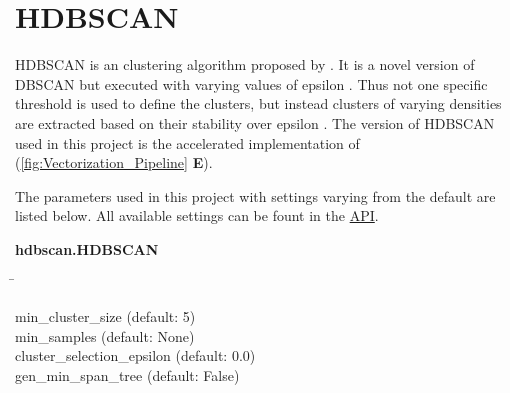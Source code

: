 \section{HDBSCAN} \label{sec:HDBSCAN}

\gls{HDBSCAN} is an clustering algorithm proposed by \textcite{campello_hierarchical_2015}. It is a novel version of \gls{DBSCAN} but executed with varying values of epsilon \autocite{hutchison_density-based_2013}. Thus not one specific threshold is used to define the clusters, but instead clusters of varying densities are extracted based on their stability over epsilon \autocite{mcinnes_hdbscan_2017}. The version of \gls{HDBSCAN} used in this project is the accelerated implementation of \textcite{mcinnes_accelerated_2017} (\autoref{fig:Vectorization_Pipeline} \textsf{\textbf{E}}).

\autocite{mcinnes_accelerated_2017}

\autocite{malzer_hybrid_2020}



The parameters used in this project with settings varying from the default are listed below. All available settings can be fount in the \href{https://hdbscan.readthedocs.io/en/latest/api.html}{API}.

\begin{leftbar}
    \textbf{hdbscan.HDBSCAN}
    \begin{nstabbing}
        \qquad\qquad\qquad\qquad\qquad\quad\=\kill

        min\_cluster\_size \> (default: 5)\\
        
        min\_samples \> (default: None)\\
        
        cluster\_selection\_epsilon \> (default: 0.0)\\
        
        gen\_min\_span\_tree \> (default: False)
        
    \end{nstabbing}
\end{leftbar}

